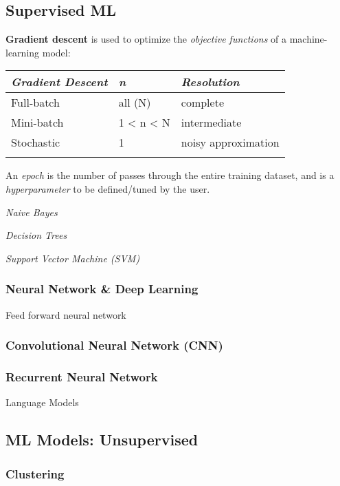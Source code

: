 \documentclass[10pt,landscape,letterpaper]{cheatsheet}
\begin{document}
\begin{multicols}{3}
\subsection{Supervised ML}

\textbf{Gradient descent} is used to optimize the \emph{objective functions} of a machine-learning model: 

\begin{tabular}{lll}
    \toprule
    \emph{Gradient Descent} & \emph{n} & \emph{Resolution}\\
    \midrule
    Full-batch & all (N) & complete \\
    Mini-batch & 1 < n < N  & intermediate \\
    Stochastic & 1 & noisy approximation \\
    \bottomrule\addlinespace
\end{tabular}

An \emph{epoch} is the number of passes through the entire training dataset, and is a \emph{hyperparameter} to be defined/tuned by the user.

\emph{Naive Bayes}

\emph{Decision Trees}

\emph{Support Vector Machine (SVM)}

\subsubsection{Neural Network \& Deep Learning}

Feed forward neural network

\subsubsection{Convolutional Neural Network (CNN)}

\subsubsection{Recurrent Neural Network}

Language Models

\subsection{ML Models: Unsupervised}

\subsubsection{Clustering}


\end{multicols}
\end{document}
